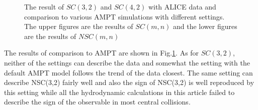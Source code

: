 \begin{figure}[!p]
\begin{center}
        \caption{The result of  $SC(3,2)$ and $SC(4,2)$ with ALICE data and comparison to various AMPT simulations with different settings.  The upper figures are the results of $SC(m,n)$ and the lower figures are the results of  $NSC(m,n)$}
        \label{AMPTcomLowSC}
        \end{center}   
     \end{figure}

The results of comparison to AMPT are shown in Fig.\ref{AMPTcomLowSC}. As for $SC(3,2)$, neither of the settings can describe the data and somewhat the setting with the default AMPT model follows the trend of the data closest. The same setting can describe NSC(3,2) fairly well and also the sign of NSC(3,2) is well reproduced by this setting while all the hydrodynamic calculations in this article failed to describe the sign of the observable in most central collisions.

